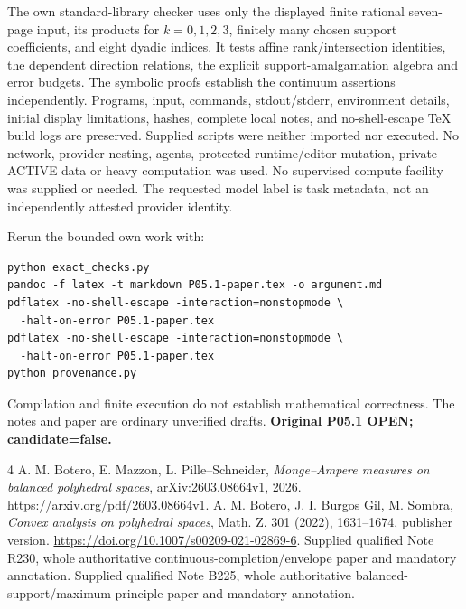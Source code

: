 \documentclass[11pt]{article}
\begin{document}
The own standard-library checker uses only the displayed finite rational seven-page input, its products for $k=0,1,2,3$, finitely many chosen support coefficients, and eight dyadic indices. It tests affine rank/intersection identities, the dependent direction relations, the explicit support-amalgamation algebra and error budgets. The symbolic proofs establish the continuum assertions independently. Programs, input, commands, stdout/stderr, environment details, initial display limitations, hashes, complete local notes, and no-shell-escape TeX build logs are preserved. Supplied scripts were neither imported nor executed. No network, provider nesting, agents, protected runtime/editor mutation, private ACTIVE data or heavy computation was used. No supervised compute facility was supplied or needed. The requested model label is task metadata, not an independently attested provider identity.

Rerun the bounded own work with:
\begin{verbatim}
python exact_checks.py
pandoc -f latex -t markdown P05.1-paper.tex -o argument.md
pdflatex -no-shell-escape -interaction=nonstopmode \
  -halt-on-error P05.1-paper.tex
pdflatex -no-shell-escape -interaction=nonstopmode \
  -halt-on-error P05.1-paper.tex
python provenance.py
\end{verbatim}
Compilation and finite execution do not establish mathematical correctness. The notes and paper are ordinary unverified drafts. \textbf{Original P05.1 OPEN; candidate=false.}

\begin{thebibliography}{4}
 A. M. Botero, E. Mazzon, L. Pille--Schneider, \emph{Monge--Ampere measures on balanced polyhedral spaces}, arXiv:2603.08664v1, 2026. \url{https://arxiv.org/pdf/2603.08664v1}.
\bibitem{BBGS} A. M. Botero, J. I. Burgos Gil, M. Sombra, \emph{Convex analysis on polyhedral spaces}, Math. Z. 301 (2022), 1631--1674, publisher version. \url{https://doi.org/10.1007/s00209-021-02869-6}.
\bibitem{R230} Supplied qualified Note R230, whole authoritative continuous-completion/envelope paper and mandatory annotation.
\bibitem{B225} Supplied qualified Note B225, whole authoritative balanced-support/maximum-principle paper and mandatory annotation.
\end{thebibliography}
\end{document}

